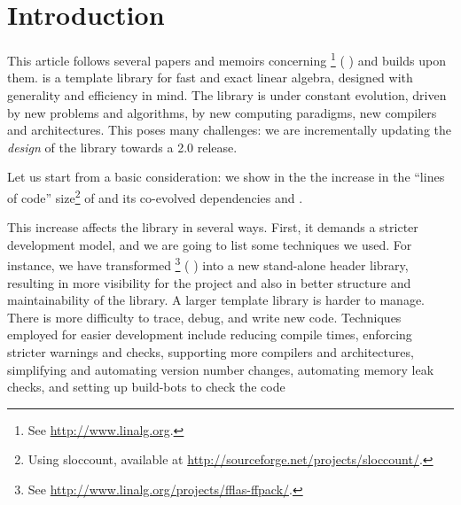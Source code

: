 \section{Introduction}
%
This article follows several papers and memoirs concerning \linbox%
%
\footnote{See \url{http://www.linalg.org}.}
%
(\cf{} \cite{Giorgi:2004:these,Turner:2002:these,Boyer:2012:these,Dumas:2002:icms,Dumas:2010:lbpar})
and builds upon them.
%
\linbox is a \cpp template library for fast and exact linear algebra, designed with generality 
and efficiency in mind.
%
%
The \linbox library is under constant evolution, driven by new problems and
algorithms, by new computing paradigms, new compilers and architectures. This
poses many challenges: we are incrementally
updating the \emph{design} of the library towards a \textsf{2.0} release.
%
\par
%
Let us start from a basic consideration: we show in the  the
increase in the ``lines of code'' size\footnote{Using \textsf{sloccount}, available at
\url{http://sourceforge.net/projects/sloccount/}.}
%
of \linbox and its co-evolved dependencies \givaro and \fflasffpack.
%
%

%
This increase affects the library in several ways.  First, it demands a
stricter development model, and we are going to list some techniques we used.
For instance, we have transformed \fflasffpack %
%
\footnote{See \url{http://www.linalg.org/projects/fflas-ffpack/}.}
(\cf{} \cite{Dumas:2008:Flas}) into a new stand-alone header library, resulting
in more visibility for the \fflasffpack project
and also in better structure and maintainability of the library.
%
%
A larger template library is harder to manage. There is more difficulty
to trace, debug, and write new code. Techniques employed
for easier development include reducing
compile times, enforcing stricter warnings and checks, supporting more
compilers and architectures, simplifying and automating version number
changes, automating memory leak checks, and setting up build-bots to check the code
